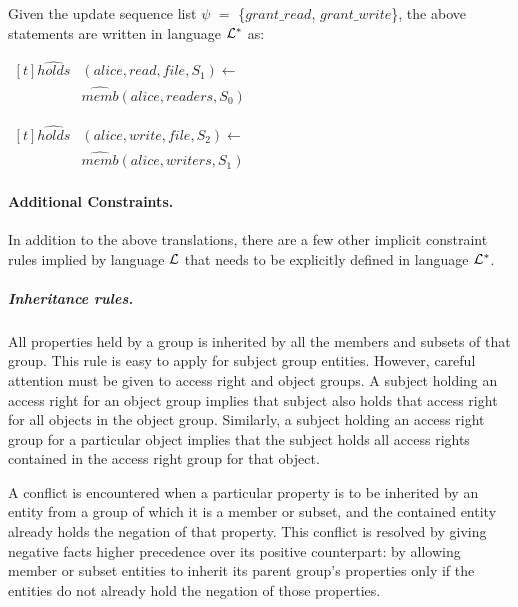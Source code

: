 \documentclass[11pt, twocolumn]{article}
\newenvironment{vquote}
  {\begin{list}{}{\leftmargin 1em}\item[]}
  {\end{list}}
\begin{document}
          Given the update sequence list $\psi$ $=$
          \{$grant\_read$, $grant\_write$\}, the above statements are written
          in language ${\cal L}^{*}$ as:

          \begin{vquote}
            \begin{math}
              \begin{aligned}[t]
                \hat{holds}&(alice, read, file, S_{1}) \leftarrow \\
                & \hat{memb}(alice, readers, S_{0})
              \end{aligned}
            \end{math}

            \begin{math}
              \begin{aligned}[t]
                \hat{holds}&(alice, write, file, S_{2}) \leftarrow \\
                & \hat{memb}(alice, writers, S_{1})
              \end{aligned}
            \end{math}
          \end{vquote}

        \paragraph{Additional Constraints.}

          In addition to the above translations, there are a few other implicit
          constraint rules implied by language ${\cal L}$ that needs to be
          explicitly defined in language ${\cal L}^{*}$.

          \subparagraph{Inheritance rules.}

            All properties held by a group is inherited by all the members and
            subsets of that group. This rule is easy to apply for subject group
            entities. However, careful attention must be given to access right
            and object groups. A subject holding an access right for an object
            group implies that subject also holds that access right for all
            objects in the object group. Similarly, a subject holding an access
            right group for a particular object implies that the subject holds
            all access rights contained in the access right group for that
            object.

            A conflict is encountered when a particular property is to be
            inherited by an entity from a group of which it is a member or
            subset, and the contained entity already holds the negation of
            that property. This conflict is resolved by giving negative facts
            higher precedence over its positive counterpart: by allowing member
            or subset entities to inherit its parent group's properties only if
            the entities do not already hold the negation of those properties.
\end{document}
